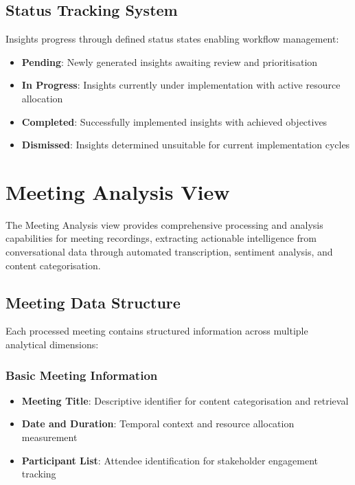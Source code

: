 \documentclass{article}
\begin{document}
\subsection{Status Tracking System}
Insights progress through defined status states enabling workflow management:

\begin{itemize}
    \item \textbf{Pending}: Newly generated insights awaiting review and prioritisation
    \item \textbf{In Progress}: Insights currently under implementation with active resource allocation
    \item \textbf{Completed}: Successfully implemented insights with achieved objectives
    \item \textbf{Dismissed}: Insights determined unsuitable for current implementation cycles
\end{itemize}

\section{Meeting Analysis View}
The Meeting Analysis view provides comprehensive processing and analysis capabilities for meeting recordings, extracting actionable intelligence from conversational data through automated transcription, sentiment analysis, and content categorisation.

\subsection{Meeting Data Structure}
Each processed meeting contains structured information across multiple analytical dimensions:

\subsubsection{Basic Meeting Information}
\begin{itemize}
    \item \textbf{Meeting Title}: Descriptive identifier for content categorisation and retrieval
    \item \textbf{Date and Duration}: Temporal context and resource allocation measurement
    \item \textbf{Participant List}: Attendee identification for stakeholder engagement tracking
\end{itemize}
\end{document}
